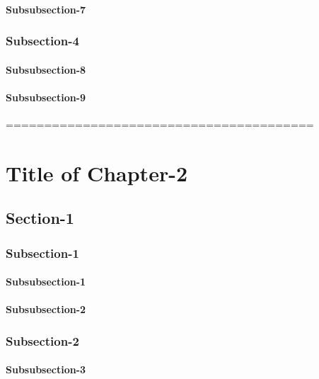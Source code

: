 \documentclass{memoir}
\begin{document}
				\subsubsection{Subsubsection-7}
		
			\subsection{Subsection-4}
		
				\subsubsection{Subsubsection-8}
		
				\subsubsection{Subsubsection-9}
	
	========================================
	
	\chapter{Title of Chapter-2}
	
		\section{Section-1}
		
			\subsection{Subsection-1}
		
				\subsubsection{Subsubsection-1}
		
				\subsubsection{Subsubsection-2}
		
			\subsection{Subsection-2}
		
				\subsubsection{Subsubsection-3}
		
\end{document}
